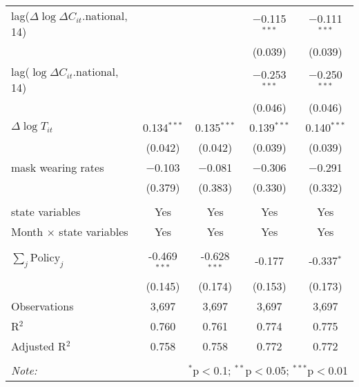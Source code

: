\begin{tabular}{@{\extracolsep{1pt}}lcccc}
  lag($\Delta \log \Delta C_{it}$.national, 14) &  &  & $-$0.115$^{***}$ & $-$0.111$^{***}$ \\ 
  &  &  & (0.039) & (0.039) \\ 
  lag($\log \Delta C_{it}$.national, 14) &  &  & $-$0.253$^{***}$ & $-$0.250$^{***}$ \\ 
  &  &  & (0.046) & (0.046) \\ 
  $\Delta \log T_{it}$ & 0.134$^{***}$ & 0.135$^{***}$ & 0.139$^{***}$ & 0.140$^{***}$ \\ 
  & (0.042) & (0.042) & (0.039) & (0.039) \\ 
  mask wearing rates & $-$0.103 & $-$0.081 & $-$0.306 & $-$0.291 \\ 
  & (0.379) & (0.383) & (0.330) & (0.332) \\ 
 \hline \\[-1.8ex] 
state variables & Yes & Yes & Yes & Yes \\ 
Month $\times$ state variables & Yes & Yes & Yes & Yes \\ 
\hline \\[-1.8ex] 
$\sum_j \mathrm{Policy}_j$ & -0.469$^{***}$ & -0.628$^{***}$ & -0.177 & -0.337$^{*}$ \\ 
 & (0.145) & (0.174) & (0.153) & (0.173) \\ 
Observations & 3,697 & 3,697 & 3,697 & 3,697 \\ 
R$^{2}$ & 0.760 & 0.761 & 0.774 & 0.775 \\ 
Adjusted R$^{2}$ & 0.758 & 0.758 & 0.772 & 0.772 \\ 
\hline 
\hline \\[-1.8ex] 
\textit{Note:}  & \multicolumn{4}{r}{$^{*}$p$<$0.1; $^{**}$p$<$0.05; $^{***}$p$<$0.01} \\ 
\end{tabular} 